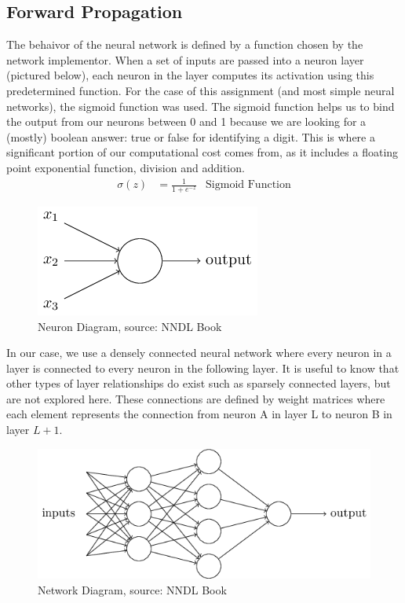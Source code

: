 \documentclass[11pt]{article}
\begin{document}
\subsection{Forward Propagation}
The behaivor of the neural network is defined by a function chosen by the network implementor. When a set of inputs are passed into a neuron layer (pictured below), each neuron in the layer computes its activation using this predetermined function. For the case of this assignment (and most simple neural networks), the sigmoid function was used. The sigmoid function helps us to bind the output from our neurons between 0 and 1 because we are looking for a (mostly) boolean answer: true or false for identifying a digit. This is where a significant portion of our computational cost comes from, as it includes a floating point exponential function, division and addition.
\begin{align}
	\sigma(z) & = \frac{1}{1 + e^{-z}} & \text{Sigmoid Function} 
\end{align}

\begin{figure}[H]
	\centering
	\includegraphics[scale=.5]{nn0.png}
	\caption{Neuron Diagram, source: NNDL Book}
\end{figure}

In our case, we use a densely connected neural network where every neuron in a layer is connected to every neuron in the following layer. It is useful to know that other types of layer relationships do exist such as sparsely connected layers, but are not explored here. These connections are defined by weight matrices where each element represents the connection from neuron A in layer L to neuron B in layer $L+1$.

\begin{figure}[H]
	\centering
	\includegraphics[width=.45\textwidth]{nn1.png}
	\caption{Network Diagram, source: NNDL Book}
\end{figure}
\end{document}
